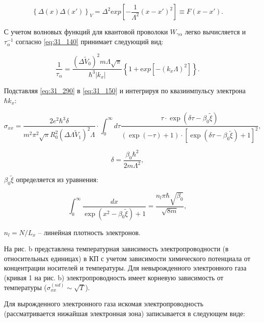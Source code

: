 \begin{equation} \label{eq:31_280}
\left\{\Delta (x)\Delta (x')\right\}_{V} =\Delta ^{2} {\mathrm exp}\left[-\frac{1}{\Lambda ^{2} } \left(x-x'\right)^{2} \right]\equiv F\left(x-x'\right).
\end{equation}

С учетом волновых функций для квантовой проволоки \cite{Constantinou1989} $W_{\gamma \alpha } $ легко вычисляется и $\tau _{\alpha }^{-1} $ согласно \eqref{eq:31_140} принимает следующий вид:

\begin{equation} \label{eq:31_290}
\frac{1}{\tau _{\alpha } } =\frac{(\Delta \tilde{V}_{0} )^{2} m\Lambda \sqrt{\pi } }{\hbar ^{3} \left|k_{x} \right|} \left\{{\mathrm 1}+{\mathrm exp}\left[{\mathrm -}\left(k_{x} \Lambda \right)^{2} \right]\right\}.
\end{equation}

Подставляя \eqref{eq:31_290} в \eqref{eq:31_150} и интегрируя по квазиимпульсу электрона $\hbar k_{x} $:

\begin{equation} \label{eq:31_300}
\sigma _{xx} =\frac{2e^{2} \hbar ^{3} \delta }{m^{2} \pi ^{2} \sqrt{\pi } R_{0}^{2} \left(\Delta \Lambda \tilde{V}_{1} \right)^{2} \Lambda } \cdot \int _{0}^{\infty }d\tau \frac{\tau \cdot {\exp}\left(\delta \tau -\beta _{0} \tilde{\xi }\right)}{\left(\exp(-\tau )+1\right)\cdot \left[{\exp}\left(\delta \tau -\beta _{0} \tilde{\xi }\right)+1\right]^{2} },
\end{equation}

$$\delta =\frac{\beta _{0} \hbar ^{2} }{2m\Lambda ^{2} },$$

\noindent $\beta _{0} \tilde{\xi }$ определяется из уравнения:

\[
\int _{0}^{\infty }\frac{dx}{\exp \left(x^{2} -\beta _{0} \tilde{\xi }\right)+1} =\frac{n_{l} \pi \hbar \sqrt{\beta _{0} } }{\sqrt{8m} },
\]

\noindent $n_{l} =N/L_{x} $ -- линейная плотность электронов.

На рис. b представлена температурная зависимость электропроводности (в относительных единицах) в КП с учетом зависимости химического потенциала от концентрации носителей и температуры. Для невырожденного электронного газа (кривая 1 на рис. b) электропроводность имеет корневую зависимость от температуры ($\sigma _{xx}^{(nd)} \sim \sqrt{T} $).

Для вырожденного электронного газа искомая электропроводность (рассматривается нижайшая электронная зона) записывается в следующем виде:

